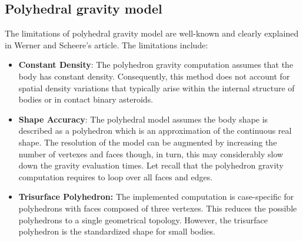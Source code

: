 \subsection{Polyhedral gravity model}
The limitations of polyhedral gravity model are well-known and clearly explained in Werner and Scheere's article\cite{werner1996}. The limitations include:
\begin{itemize}
	\item \textbf{Constant Density}: The polyhedron gravity computation assumes that the body has constant density. Consequently, this method does not account for spatial density variations that typically arise within the internal structure of bodies or in contact binary asteroids.
	\item \textbf{Shape Accuracy}: The polyhedral model assumes the body shape is described as a polyhedron which is an approximation of the continuous real shape. The resolution of the model can be augmented by increasing the number of vertexes and faces though, in turn, this may considerably slow down the gravity evaluation times. Let recall that the polyhedron gravity computation requires to loop over all faces and edges.
	\item \textbf{Trisurface Polyhedron:} The implemented computation is case-specific for polyhedrons with faces composed of three vertexes. This reduces the possible polyhedrons to a single geometrical topology. However, the trisurface polyhedron is the standardized shape for small bodies.     
\end{itemize}


